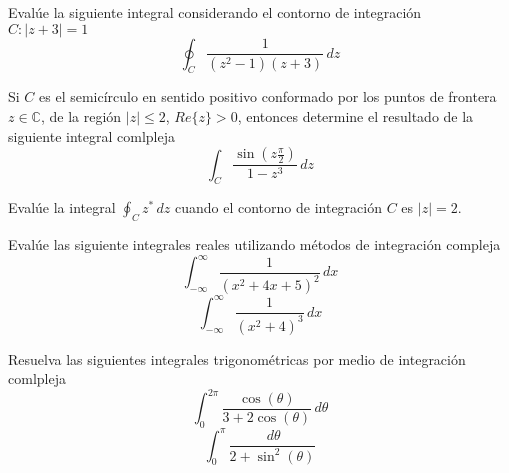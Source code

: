 \begin{ejercicio}
    Evalúe la siguiente integral considerando el contorno de integración\\ $C:|z+3|=1$
    $$ \oint_C \dfrac{1}{(z^2-1)(z+3)} \,dz$$
\end{ejercicio}

\begin{ejercicio}
    Si $C$ es el semicírculo en sentido positivo conformado por los puntos de frontera $z \in \mathbb{C}$, de la región $|z|\leq 2$, $Re\{z\}>0$, entonces determine el resultado de la siguiente integral comlpleja
    $$ \int_C \dfrac{\sin(z\frac{\pi}{2})}{1-z^3}\,dz $$
\end{ejercicio}

\begin{ejercicio}
    Evalúe la integral $\displaystyle \oint_C z^* \,dz$ cuando el contorno de integración $C$ es $|z|=2$.
\end{ejercicio}

\begin{ejercicio}
    Evalúe las siguiente integrales reales utilizando métodos de integración compleja
    $$ \int_{-\infty}^{\infty} \dfrac{1}{(x^2+4x+5)^2} \,dx $$
    $$ \int_{-\infty}^{\infty} \dfrac{1}{(x^2+4)^3} \,dx $$
\end{ejercicio}

\begin{ejercicio}
    Resuelva las siguientes integrales trigonométricas por medio de integración comlpleja
    $$ \int_0^{2\pi} \dfrac{\cos(\theta)}{3+2\cos(\theta)} \,d\theta $$
    $$ \int_0^{\pi}  \dfrac{\,d\theta}{2+\sin^2(\theta)} $$
\end{ejercicio}
